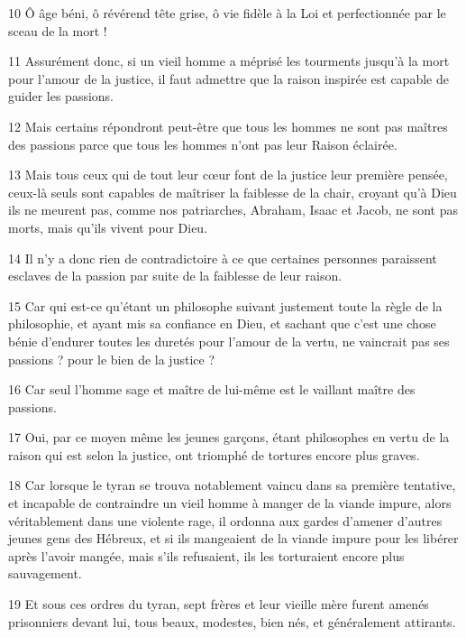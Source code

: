 \par 10 Ô âge béni, ô révérend tête grise, ô vie fidèle à la Loi et perfectionnée par le sceau de la mort !

\par 11 Assurément donc, si un vieil homme a méprisé les tourments jusqu'à la mort pour l'amour de la justice, il faut admettre que la raison inspirée est capable de guider les passions.

\par 12 Mais certains répondront peut-être que tous les hommes ne sont pas maîtres des passions parce que tous les hommes n'ont pas leur Raison éclairée.

\par 13 Mais tous ceux qui de tout leur cœur font de la justice leur première pensée, ceux-là seuls sont capables de maîtriser la faiblesse de la chair, croyant qu'à Dieu ils ne meurent pas, comme nos patriarches, Abraham, Isaac et Jacob, ne sont pas morts, mais qu'ils vivent pour Dieu.

\par 14 Il n'y a donc rien de contradictoire à ce que certaines personnes paraissent esclaves de la passion par suite de la faiblesse de leur raison.

\par 15 Car qui est-ce qu'étant un philosophe suivant justement toute la règle de la philosophie, et ayant mis sa confiance en Dieu, et sachant que c'est une chose bénie d'endurer toutes les duretés pour l'amour de la vertu, ne vaincrait pas ses passions ? pour le bien de la justice ?

\par 16 Car seul l'homme sage et maître de lui-même est le vaillant maître des passions.

\par 17 Oui, par ce moyen même les jeunes garçons, étant philosophes en vertu de la raison qui est selon la justice, ont triomphé de tortures encore plus graves.

\par 18 Car lorsque le tyran se trouva notablement vaincu dans sa première tentative, et incapable de contraindre un vieil homme à manger de la viande impure, alors véritablement dans une violente rage, il ordonna aux gardes d'amener d'autres jeunes gens des Hébreux, et si ils mangeaient de la viande impure pour les libérer après l'avoir mangée, mais s'ils refusaient, ils les torturaient encore plus sauvagement.

\par 19 Et sous ces ordres du tyran, sept frères et leur vieille mère furent amenés prisonniers devant lui, tous beaux, modestes, bien nés, et généralement attirants.

